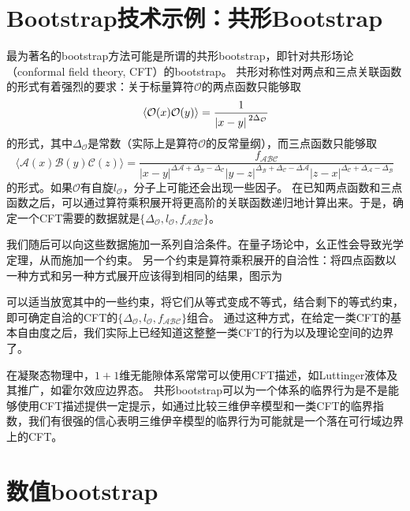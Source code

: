 \documentclass[oneside]{fduthesis}
\begin{document}
\section{Bootstrap技术示例：共形Bootstrap}

最为著名的bootstrap方法可能是所谓的共形bootstrap，即针对共形场论（conformal field theory, CFT）的bootstrap\cite{Poland_2016}。
共形对称性对两点和三点关联函数的形式有着强烈的要求：关于标量算符$\mathcal{O}$的两点函数只能够取
\begin{equation}
    \expval*{\mathcal{O}(x) \mathcal{O}(y)} = \frac{1}{{\abs*{x - y}}^{2 \Delta_{\mathcal{O}}}}
    \label{eq:two-point-conformal}
\end{equation}
的形式，其中$\Delta_{\mathcal{O}}$是常数（实际上是算符$\mathcal{O}$的反常量纲），而三点函数只能够取
\begin{equation}
    \langle\mathcal{A}(x) \mathcal{B}(y) \mathcal{C}(z)\rangle = \frac{f_{\mathcal{A B C}}}{|x-y|^{\Delta \mathcal{A}+\Delta_{\mathcal{B}}-\Delta_{\mathcal{C}}}|y-z|^{\Delta_{\mathcal{B}}+\Delta_{\mathcal{C}}-\Delta \mathcal{A}}|z-x|^{\Delta_{\mathcal{C}}+\Delta_{\mathcal{A}}-\Delta_{\mathcal{B}}}}
    \label{eq:three-point-conformal}
\end{equation}
的形式。如果$\mathcal{O}$有自旋$l_{\mathcal{O}}$，分子上可能还会出现一些因子。
在已知两点函数和三点函数之后，可以通过算符乘积展开将更高阶的关联函数递归地计算出来。于是，确定一个CFT需要的数据就是$\{\Delta_{\mathcal{O}}, l_{\mathcal{O}}, f_{\mathcal{A} \mathcal{B} \mathcal{C}}\}$。

我们随后可以向这些数据施加一系列自洽条件。在量子场论中，幺正性会导致光学定理，从而施加一个约束。
另一个约束是算符乘积展开的自洽性：将四点函数以一种方式和另一种方式展开应该得到相同的结果，图示为

可以适当放宽其中的一些约束，将它们从等式变成不等式，结合剩下的等式约束，即可确定自洽的CFT的$\{\Delta_{\mathcal{O}}, l_{\mathcal{O}}, f_{\mathcal{A} \mathcal{B} \mathcal{C}}\}$组合。
通过这种方式，在给定一类CFT的基本自由度之后，我们实际上已经知道这整整一类CFT的行为以及理论空间的边界了\cite{Poland_2016,2019}。

在凝聚态物理中，$1+1$维无能隙体系常常可以使用CFT描述，如Luttinger液体及其推广，如霍尔效应边界态\cite{Degiovanni_1998}。
共形bootstrap可以为一个体系的临界行为是不是能够使用CFT描述提供一定提示，如通过比较三维伊辛模型和一类CFT的临界指数，我们有很强的信心表明三维伊辛模型的临界行为可能就是一个落在可行域边界上的CFT\cite{prd2012ising,Poland_2016}。

\section{数值bootstrap}\label{sec:numerical-boostrap-intro}
\end{document}
